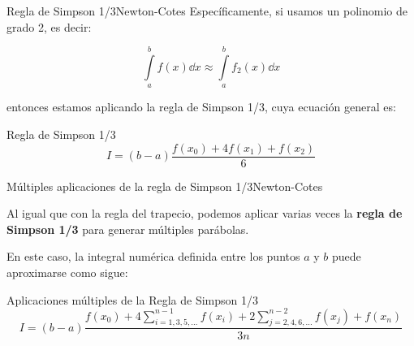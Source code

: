 \documentclass[spanish, c, dvipsnames]{beamer}
\begin{document}
\begin{frame}{Regla de Simpson 1/3}{Newton-Cotes}
    Específicamente, si usamos un polinomio de grado 2, es decir:

    $$\int\limits_a^b f(x)\dd{x} \approx  \int\limits_a^b f_2(x)\dd{x}$$

    \bigskip

    entonces estamos aplicando la \alert{regla de Simpson 1/3}, cuya ecuación general es:

    \bigskip

    \begin{block}{Regla de Simpson 1/3}
        \begin{equation}
            \label{eq:simpson13-single}
            I = (b-a) \frac{f(x_0) + 4 f(x_1) + f(x_2)}{6}
        \end{equation}
    \end{block}

\end{frame}

\begin{frame}{Múltiples aplicaciones de la regla de Simpson 1/3}{Newton-Cotes}

    Al igual que con la regla del trapecio, podemos aplicar varias veces la \textbf{regla de Simpson 1/3} para generar \alert{múltiples parábolas}.

    \bigskip

    En este caso, la integral numérica definida entre los puntos $a$ y $b$ puede aproximarse como sigue:

    \bigskip

    \begin{exampleblock}{Aplicaciones múltiples de la Regla de Simpson 1/3}
    \begin{equation}
        \label{eq:simpson13-multi}
        I = (b - a) \frac{f(x_0) + 4 \sum\limits_{i=1,3,5, \dots}^{n-1}f(x_i) + 2 \sum\limits_{j=2,4,6, \dots}^{n-2} f(x_j) + f(x_n)}{3n}
    \end{equation}
    \end{exampleblock}

\end{frame}
\end{document}

